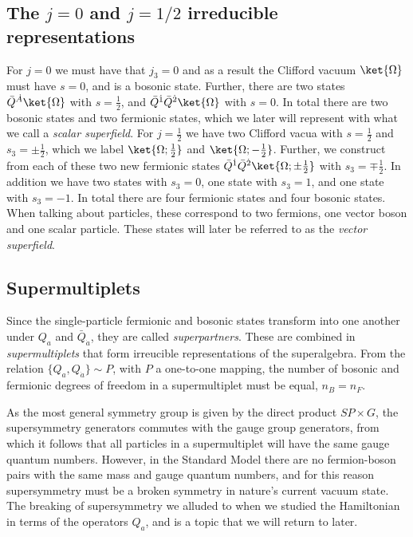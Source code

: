 \subsection{The $j=0$ and $j=1/2$ irreducible representations}
For $j=0$ we must have that $j_3=0$ and as a result the Clifford vacuum $\ket{\Omega}$ must have $s=0$, and is a bosonic state. Further, there are two states $\bar{Q}^{\dot{A}}\ket{\Omega}$ with $s=\frac{1}{2}$, and $\bar{Q}^{\dot{1}}\bar{Q}^{\dot{2}}\ket{\Omega}$ with $s=0$. In total there are two bosonic states and two fermionic states, which we later will represent with what we call a \emph{scalar superfield}.
\medskip
For $j=\frac{1}{2}$ we have two Clifford vacua with $s=\frac{1}{2}$ and $s_{3}=\pm\frac{1}{2}$, which we label $\ket{\Omega;\frac{1}{2}}$ and $\ket{\Omega;-\frac{1}{2}}$. Further, we construct from each of these two new fermionic states $\bar{Q}^{\dot{1}}\bar{Q}^{\dot{2}}\ket{\Omega;\pm\frac{1}{2}}$ with $s_{3}=\mp\frac{1}{2}$. In addition we have two states with $s_3=0$, one state with $s_3=1$, and one state with $s_3=-1$. In total there are four fermionic states and four bosonic states. When talking about particles, these correspond to two fermions, one vector boson and one scalar particle. These states will later be referred to as the \emph{vector superfield}.


\subsection{Supermultiplets}
Since the single-particle fermionic and bosonic states transform into one another under $Q_{a}$ and $\bar{Q}_{\dot{a}}$, they are called \textit{superpartners}. These are combined in \textit{supermultiplets} that form irreucible representations of the superalgebra. From the relation $\{Q_{a},Q_{\dot{a}}\}\sim P$, with $P$ a one-to-one mapping, the number of bosonic and fermionic degrees of freedom in a supermultiplet must be equal, $n_B=n_F$.

As the most general symmetry group is given by the direct product $SP\times G$, the supersymmetry generators commutes with the gauge group generators, from which it follows that all particles in a supermultiplet will have the same gauge quantum numbers. However, in the Standard Model there are no fermion-boson pairs with the same mass and gauge quantum numbers, and for this reason supersymmetry must be a broken symmetry in nature's current vacuum state. The breaking of supersymmetry we alluded to when we studied the Hamiltonian in terms of the operators $Q_{a}$, and is a topic that we will return to later.
\medskip

